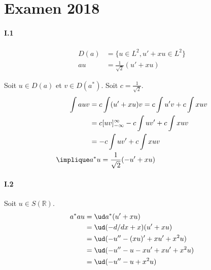 \section{Examen 2018}

\paragraph{I.1}

\begin{align}
    D(a) &= \{ u \in L^2, u' + xu \in L^2 \} \\
    au &= \frac{1}{\sqrt{2}} (u' + xu)
\end{align}

%


Soit $u \in D(a)$ et $v \in D(a^*)$. Soit $c = \frac{1}{\sqrt{2}}$.
\begin{align}
    \int au v &= c \int (u' + xu) v
    = c \int u'v + c \int xuv \\
    &= c[uv]_{-\infty}^\infty - c \int uv' + c \int xuv \\
    &= -c \int uv' + c \int xuv \\
    \implique & a^* u = \frac{1}{\sqrt{2}} (-u' + xu)
\end{align}


%
%

\paragraph{I.2}

Soit $u \in S(\mathbb{R})$.
\begin{align}
    a^* a u &= \ud a^* (u' + xu) \\
    &= \ud (-d/dx + x) (u' + xu) \\
    &= \ud (-u'' - (xu)' + xu' + x^2u) \\
    &= \ud (-u'' - u - xu' + xu' + x^2u) \\
    &= \ud (-u'' - u + x^2u)
\end{align}

